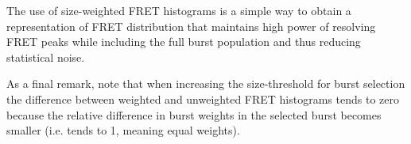 The use of size-weighted FRET histograms is a simple way to obtain a representation of FRET 
distribution that maintains high power of resolving FRET peaks while including the full burst
population and thus reducing statistical noise.

As a final remark, note that when increasing the size-threshold for burst selection
the difference between weighted and unweighted FRET histograms tends to zero because
the relative difference in burst weights in the selected burst becomes smaller 
(i.e. tends to 1, meaning equal weights).